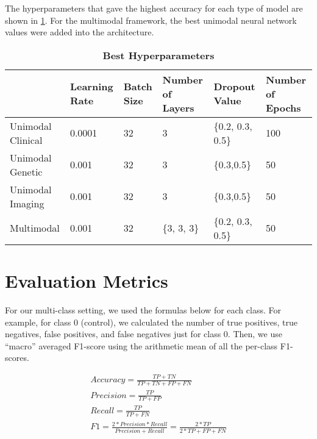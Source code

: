 \noindent The hyperparameters that gave the highest accuracy for each type of model are shown in \ref{tab:best_hyper}. For the multimodal framework, the best unimodal neural network values were added into the architecture. 

\begin{table}[H]
\centering
\caption{\textbf{Best Hyperparameters}}\label{tab:best_hyper}
\begin{tabular}{|l|l|l|l|l|l|}
\hline
                  & \textbf{Learning Rate} & \textbf{Batch Size} & \textbf{Number of Layers} & \textbf{Dropout Value} & \textbf{Number of Epochs} \\ \hline
Unimodal Clinical & 0.0001                 & 32                  & 3                         & \{0.2, 0.3, 0.5\}      & 100                       \\ \hline
Unimodal Genetic  & 0.001                  & 32                  & 3                         & \{0.3,0.5\}            & 50                        \\ \hline
Unimodal Imaging  & 0.001                  & 32                  & 3                         & \{0.3,0.5\}            & 50                        \\ \hline
Multimodal        & 0.001                  & 32                  & \{3, 3, 3\}               & \{0.2, 0.3, 0.5\}      & 50                        \\ \hline

\end{tabular}
\end{table}


\section{Evaluation Metrics}
\label{eval_formula}
For our multi-class setting, we used the formulas below for each class. For example, for class 0 (control), we calculated the number of true positives, true negatives, false positives, and false negatives just for class 0. Then, we use “macro” averaged F1-score using the arithmetic mean of all the per-class F1-scores.

\begin{gather*}
Accuracy = \frac{TP+TN}{TP+TN+FP+FN}\\
Precision = \frac{TP}{TP+FP}\\
Recall = \frac{TP}{TP+FN}\\
F1 = \frac{2*Precision*Recall}{Precision+Recall} = \frac{2*TP}{2*TP+FP+FN}\\
\end{gather*}

